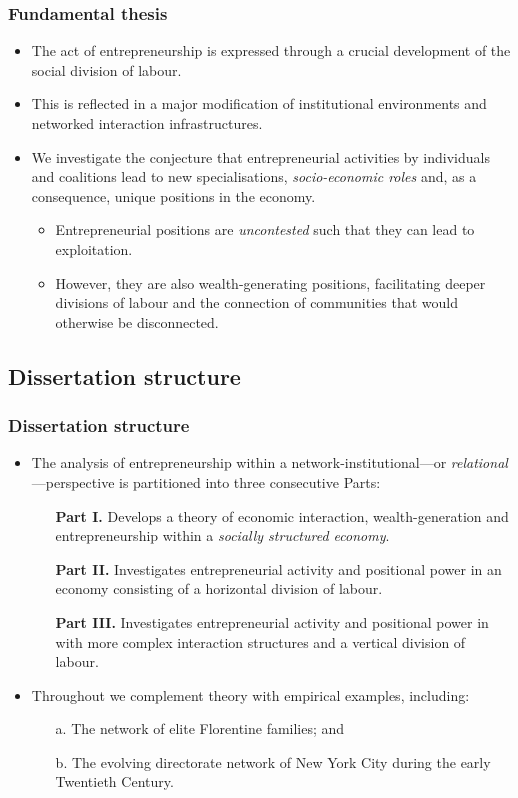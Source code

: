 \documentclass[10pt]{beamer}
\begin{document}
\begin{frame} \frametitle{Fundamental thesis}
\begin{itemize}
\item The act of entrepreneurship is expressed through a crucial development of the social division of labour.
\medskip
\item This is reflected in a major modification of institutional environments and networked interaction infrastructures.
\medskip
\item We investigate the conjecture that entrepreneurial activities by individuals and coalitions lead to new specialisations, \emph{socio-economic roles} and, as a consequence, unique positions in the economy.
\medskip
\begin{itemize}
\item Entrepreneurial positions are \emph{uncontested} such that they can lead to exploitation.
\medskip
\item However, they are also wealth-generating positions, facilitating deeper divisions of labour and the connection of communities that would otherwise be disconnected.
\end{itemize}
\end{itemize}
\end{frame}

\subsection{Dissertation structure}

\begin{frame} \frametitle{Dissertation structure}
\begin{itemize}
\item The analysis of entrepreneurship within a network-institutional---or \emph{relational}---perspective is partitioned into three consecutive Parts:
\medskip
\begin{itemize}
\item[\textbf{Part I.}] Develops a theory of economic interaction, wealth-generation and entrepreneurship within a \emph{socially structured economy}.
\medskip
\item[\textbf{Part II.}] Investigates entrepreneurial activity and positional power in an economy consisting of a horizontal division of labour.
\medskip
\item[\textbf{Part III.}] Investigates entrepreneurial activity and positional power in with more complex interaction structures and a vertical division of labour.
\end{itemize}
\medskip
\item Throughout we complement theory with empirical examples, including:
\begin{itemize}
\item[a.] The network of elite Florentine families; and
\medskip
\item[b.] The evolving directorate network of New York City during the early Twentieth Century.
\end{itemize}
\end{itemize}
\end{frame}
\end{document}
